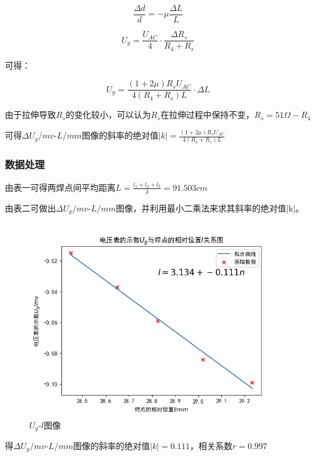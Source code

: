 \documentclass[a4paper,UTF8]{ctexart}
\begin{document}
\begin{equation*}
    \frac{\Delta d}{d} = -\mu \frac{\Delta L}{L}
\end{equation*}

\begin{equation*}
    U_g = \frac{U_{AC}}{4}\cdot \frac{\Delta R_s}{R_4+R_s}
\end{equation*}

可得：

\begin{equation}
    U_g = \frac{(1+2\mu)R_s U_{AC}}{4(R_4+R_s)L} \cdot \Delta L
\end{equation}

由于拉伸导致$R_s$的变化较小，可以认为$R_s$在拉伸过程中保持不变，$R_s = 51 \Omega - R_4$

可得$\Delta U_g /mv$-$L /mm$图像的斜率的绝对值$|k| = \frac{(1+2\mu)R_s U_{AC}}{4(R_4+R_s)L}$

\subsubsection{数据处理}

由表一可得两焊点间平均距离$L = \frac{l_1 + l_2 + l_3}{3} = 91.503cm$

由表二可做出$\Delta U_g /mv$-$L /mm$图像，并利用最小二乘法来求其斜率的绝对值|k|。

\begin{figure}[!htb]
    \centering
    \includegraphics[scale=0.5]{Figure_2.png}
    \caption{$U_g$-$l$图像}
\end{figure}

得$\Delta U_g /mv$-$L /mm$图像的斜率的绝对值$|k| = 0.111$，相关系数$r = 0.997$
\end{document}
